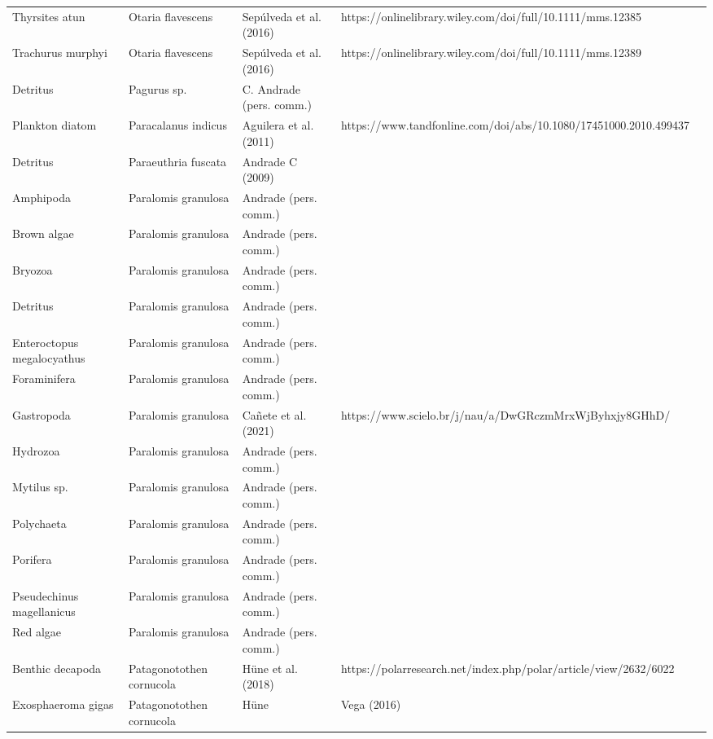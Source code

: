 \documentclass[
]{article}
\begin{document}
\begin{landscape}
\begin{longtable}[t]{>{\raggedright\arraybackslash}p{4cm}>{\centering\arraybackslash}p{4cm}>{\centering\arraybackslash}p{6cm}>{\centering\arraybackslash}p{6cm}}
Thyrsites atun & Otaria flavescens & \tiny Sepúlveda et al. (2016) & \tiny https://onlinelibrary.wiley.com/doi/full/10.1111/mms.12385\\
Trachurus murphyi & Otaria flavescens & \tiny Sepúlveda et al. (2016) & \tiny https://onlinelibrary.wiley.com/doi/full/10.1111/mms.12389\\
\addlinespace
Detritus & Pagurus sp. & \tiny C. Andrade (pers. comm.) & \tiny\\
Plankton diatom & Paracalanus indicus & \tiny Aguilera et al. (2011) & \tiny https://www.tandfonline.com/doi/abs/10.1080/17451000.2010.499437\\
Detritus & Paraeuthria fuscata & \tiny Andrade C (2009) & \tiny\\
Amphipoda & Paralomis granulosa & \tiny Andrade (pers. comm.) & \tiny\\
Brown algae & Paralomis granulosa & \tiny Andrade (pers. comm.) & \tiny\\
\addlinespace
Bryozoa & Paralomis granulosa & \tiny Andrade (pers. comm.) & \tiny\\
Detritus & Paralomis granulosa & \tiny Andrade (pers. comm.) & \tiny\\
Enteroctopus megalocyathus & Paralomis granulosa & \tiny Andrade (pers. comm.) & \tiny\\
Foraminifera & Paralomis granulosa & \tiny Andrade (pers. comm.) & \tiny\\
Gastropoda & Paralomis granulosa & \tiny Cañete et al. (2021) & \tiny https://www.scielo.br/j/nau/a/DwGRczmMrxWjByhxjy8GHhD/\\
\addlinespace
Hydrozoa & Paralomis granulosa & \tiny Andrade (pers. comm.) & \tiny\\
Mytilus sp. & Paralomis granulosa & \tiny Andrade (pers. comm.) & \tiny\\
Polychaeta & Paralomis granulosa & \tiny Andrade (pers. comm.) & \tiny\\
Porifera & Paralomis granulosa & \tiny Andrade (pers. comm.) & \tiny\\
Pseudechinus magellanicus & Paralomis granulosa & \tiny Andrade (pers. comm.) & \tiny\\
\addlinespace
Red algae & Paralomis granulosa & \tiny Andrade (pers. comm.) & \tiny\\
Benthic decapoda & Patagonotothen cornucola & \tiny Hüne et al. (2018) & \tiny https://polarresearch.net/index.php/polar/article/view/2632/6022\\
Exosphaeroma gigas & Patagonotothen cornucola & \tiny Hüne & Vega (2016) & \tiny\\

\end{longtable}
\end{landscape}
\end{document}
